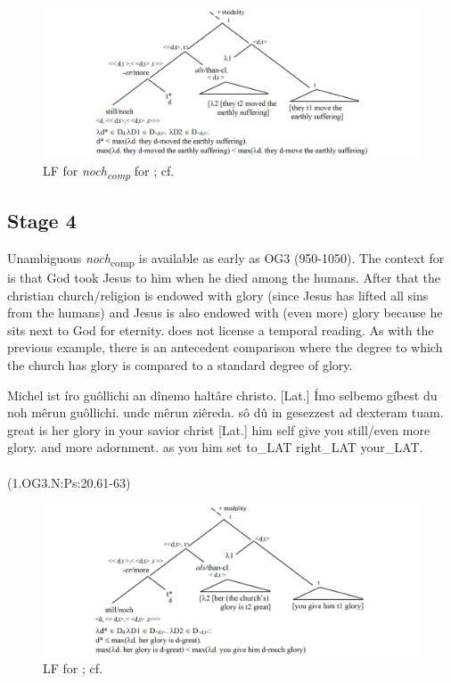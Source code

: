 \documentclass[output=paper
,modfonts
,nonflat]{langsci/langscibook}
\begin{document}
\begin{figure}
\includegraphics[width=1\textwidth]{figures/LF2_comp}
\caption{LF for \textit{noch\textsubscript{comp}} for ; cf. \citep{beck2016a_sub}}
\label{fig:LF2_comp}
\end{figure}

\subsection{Stage 4} Unambiguous \textit{noch}\textsubscript{comp} is available as early as OG3 (950-1050). The context for  is that God took Jesus to him when he died among the humans. After that the christian church/religion is endowed with glory (since Jesus has lifted all sins from the humans) and Jesus is also endowed with (even more) glory because he sits next to God for eternity.  does not license a temporal reading. As with the previous example, there is an antecedent comparison where the degree to which the church has glory is compared to a standard degree of glory.

\ea\gll Michel ist íro guôllichi an dînemo haltâre christo. [Lat.] Ímo selbemo gíbest du noh mêrun guôllichi. unde mêrun ziêreda. sô dû in gesezzest ad dexteram tuam.\\
       great is her glory in your savior christ [Lat.] him self give you still/even more glory. and more adornment. as you him set to\_LAT right\_LAT your\_LAT.\\
\label{OG3_noch_more_glory} \\ (1.OG3.N:Ps:20.61-63)
\z

\begin{figure}
\includegraphics[width=1\textwidth]{figures/LF3_comp}
\caption{LF for ; cf. \citep{beck2016a_sub}}
\label{fig:LF3_comp}
\end{figure}
\end{document}
